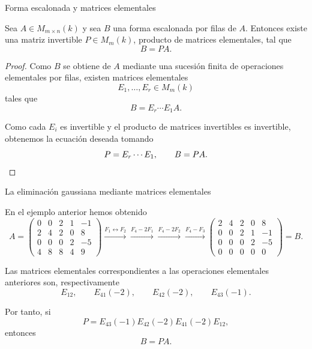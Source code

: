 \begin{frame}{Forma escalonada y matrices elementales}

\begin{corollary}
Sea \(A\in M_{m\times n}(k)\) y sea \(B\) una forma escalonada por filas
de \(A\). Entonces existe una matriz invertible \(P\in M_m(k)\),
producto de matrices elementales, tal que
\[
B=PA.
\]
\end{corollary}

\vspace{-20pt}

\begin{proof}
Como \(B\) se obtiene de \(A\) mediante una sucesión finita de
operaciones elementales por filas, existen matrices elementales
\[
E_1,\ldots,E_r\in M_m(k)
\]
tales que
\[
B=E_r\cdots E_1A.
\]

Como cada \(E_i\) es invertible y el producto de matrices invertibles
es invertible, obtenemos la ecuación deseada tomando
\[
P=E_r\cdots E_1,\qquad
B=PA.\qedhere
\]
\end{proof}

\end{frame}


\begin{frame}{La eliminación gaussiana mediante matrices elementales}

En el ejemplo anterior hemos obtenido
\[
A= \begin{pmatrix}
0&0&2&1&-1\\
2&4&2&0&8\\
0&0&0&2&-5\\
4&8&8&4&9
\end{pmatrix}
\xrightarrow{F_1\leftrightarrow F_2}
\xrightarrow{F_4-2F_1}
\xrightarrow{F_4-2F_2}
\xrightarrow{F_4-F_3}
\begin{pmatrix}
2&4&2&0&8\\
0&0&2&1&-1\\
0&0&0&2&-5\\
0&0&0&0&0
\end{pmatrix}=B.
\]

Las matrices elementales correspondientes a las operaciones elementales anteriores son, respectivamente
\[
E_{12},\qquad
E_{41}(-2),\qquad
E_{42}(-2),\qquad
E_{43}(-1).
\]

Por tanto, si
\[
P=
E_{43}(-1)E_{42}(-2)E_{41}(-2)E_{12},
\]
entonces
\[
B=PA.
\]

\end{frame}

